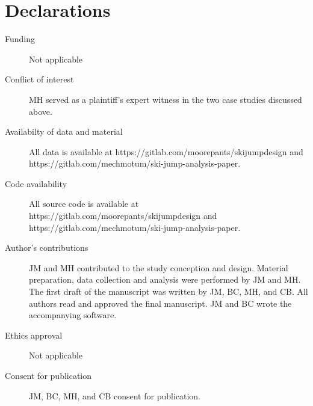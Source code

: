 \documentclass[smallextended]{svjour3}       %
\begin{document}
\section*{Declarations}
\begin{description}
  \item[Funding] Not applicable
  \item[Conflict of interest] MH served as a plaintiff's expert witness in the
    two case studies discussed above.
  \item[Availabilty of data and material] All data is available at
    https://gitlab.com/moorepants/skijumpdesign and
    https://gitlab.com/mechmotum/ski-jump-analysis-paper.
  \item[Code availability] All source code is available at
    https://gitlab.com/moorepants/skijumpdesign and
    https://gitlab.com/mechmotum/ski-jump-analysis-paper.
  \item[Author's contributions] JM and MH contributed to the study conception
    and design. Material preparation, data collection and analysis were
    performed by JM and MH. The first draft of the manuscript was written by
    JM, BC, MH, and CB. All authors read and approved the final manuscript. JM
    and BC wrote the accompanying software.
  \item[Ethics approval] Not applicable
  \item[Consent for publication] JM, BC, MH, and CB consent for publication.
\end{description}



\appendix
\end{document}
